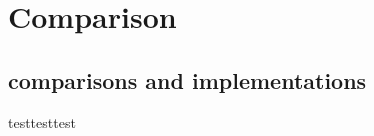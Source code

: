 \part{Comparison} \label{part:Comparison and implementation}

\chapter{comparisons and implementations}

testtesttest\\